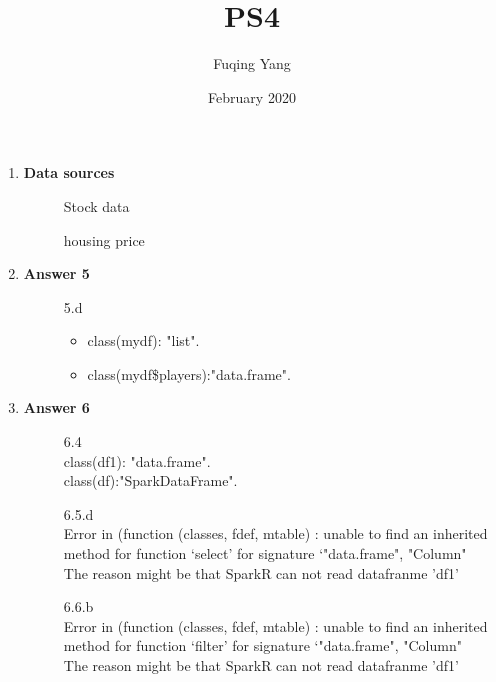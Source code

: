\documentclass{article}
\title{PS4}
\author{Fuqing Yang}
\date{February 2020}
\begin{document}
\begin{enumerate}

\maketitle

    \item \textbf{Data sources}
		  \begin{description}
	            \item[]	Stock data
	            \item[] housing price
          \end{description}

    \item \textbf{Answer 5}
		  \begin{description}
	            \item[]	5.d 
                  	 \begin{itemize} 
	                       \item   class(mydf): "list".
	                       \item   class(mydf\$players):"data.frame".
                     \end{itemize}      
          \end{description}
          
    \item \textbf{Answer 6}
		  \begin{description}
	            \item[]	6.4 \\
                  	 
                 class(df1): "data.frame".\\
                 class(df):"SparkDataFrame".
                     
                     
	            \item[] 6.5.d \\
                  	 Error in (function (classes, fdef, mtable)  :  unable to find an inherited method for function ‘select’ for signature ‘"data.frame", "Column"\\
	                   The reason might be that SparkR can not read datafranme 'df1'
                   
                     
	            \item[] 6.6.b \\
	                Error in (function (classes, fdef, mtable)  :  unable to find an inherited method for function ‘filter’ for signature ‘"data.frame", "Column"\\
                  	The reason might be that SparkR can not read datafranme 'df1'
          \end{description}
\end{enumerate}
\end{document}
